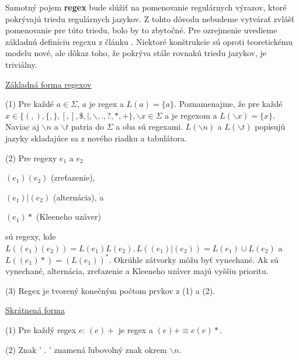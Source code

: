Samotný pojem \textbf{regex} bude slúžiť na pomenovanie regulárnych výrazov, ktoré pokrývajú triedu regulárnych jazykov. Z tohto dôvodu nebudeme vytvárať zvlášť pomenovanie pre túto triedu, bolo by to zbytočné. Pre ozrejmenie uvedieme základnú definíciu regexu z článku \cite{ExtendedRegexPower}. Niektoré konštrukcie sú oproti teoretickému modelu nové, ale dôkaz toho, že pokrýva stále rovnakú triedu jazykov, je triviálny.

\underline{Základná forma regexov}
\begin{list}{}{}
\item[(1)] Pre každé $a \in \Sigma$, $a$ je regex a $L(a)=\lbrace a \rbrace$. Poznamenajme, že pre každé $x \in \lbrace (,), \{, \},[,],\mathdollar,|, \backslash, .,?,*,+ \rbrace, \backslash x \in \Sigma $ a je regexom a $L(\backslash x) = \lbrace x \rbrace$. Naviac aj $\backslash n$ a $\backslash t$ patria do $\Sigma$ a oba sú regexami. $L(\backslash n)$ a $L(\backslash t)$ popisujú jazyky skladajúce sa z nového riadku a tabulátora.
\item[(2)] Pre regexy $e_1$ a $e_2$ 
\begin{list}{}{}
\item $(e_1)(e_2)$ (zreťazenie), 
\item $(e_1)|(e_2)$ (alternácia), a 
\item $(e_1)*$ (Kleeneho uzáver) 
\end{list}
sú regexy, kde $L((e_1)(e_2)) = L(e_1)L(e_2), L((e_1)|(e_2))=L(e_1) \cup L(e_2)$ a $L((e_1)*) = (L(e_1))^*$. Okrúhle zátvorky môžu byť vynechané. Ak sú vynechané, alternácia, zreťazenie a Kleeneho uzáver majú vyššiu prioritu.
\item[(3)] Regex je tvorený konečným počtom prvkov z (1) a (2).
\end{list}

\underline{Skrátnená forma}
\begin{list}{}{}
\item[(1)] Pre každý regex $e$: $(e)+$ je regex a $(e)+ \equiv e(e)*$.
\item[(2)] Znak ' . ' znamená ľubovolný znak okrem $\backslash n$.
\end{list}

